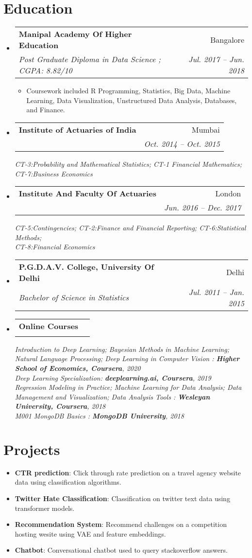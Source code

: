 \documentclass[letterpaper,11pt]{article}
\makeatletter
\newcommand{\resumeItem}[2]{
  \item\small{
    \textbf{#1}{: #2 \vspace{-2pt}}
  }
}
\newcommand{\textItem}[1]{
  \item\small{
    {#1 \vspace{-2pt}}
  }
}
\newcommand{\resumeSubheading}[4]{
  \vspace{-1pt}\item
    \begin{tabular*}{0.97\textwidth}[t]{l@{\extracolsep{\fill}}r}
      \textbf{#1} & #2 \\
      \textit{\small#3} & \textit{\small #4} \\
    \end{tabular*}\vspace{-5pt}
}
\newcommand{\resumeSubItem}[2]{\resumeItem{#1}{#2}\vspace{-4pt}}
\newcommand{\resumeSubHeadingListStart}{\begin{itemize}[leftmargin=*]}
\newcommand{\resumeSubHeadingListEnd}{\end{itemize}}
\newcommand{\resumeItemListStart}{\begin{itemize}}
\newcommand{\resumeItemListEnd}{\end{itemize}\vspace{-5pt}}
\makeatother
\begin{document}
\section{Education}
  \resumeSubHeadingListStart
    \resumeSubheading
      {Manipal Academy Of Higher Education}{Bangalore}
      {Post Graduate Diploma in Data Science ;  CGPA: 8.82/10}{Jul. 2017 -- Jun. 2018}
      \resumeItemListStart
      	\textItem{Coursework included R Programming, Statistics, Big Data, Machine Learning, Data Visualization, Unstructured Data Analysis, Databases, and Finance.}
      \resumeItemListEnd	
    \resumeSubheading
      {Institute of Actuaries of India}{Mumbai}{}{Oct. 2014 -- Oct. 2015\vspace{-7pt}}
      \textit{\small CT-3:Probability and Mathematical Statistics; CT-1 Financial Mathematics;}\\
      \textit{\small CT-7:Business Economics}
    \resumeSubheading
      {Institute And Faculty Of Actuaries}{London}{}{Jun. 2016 -- Dec. 2017\vspace{-7pt}}
      \textit{\small CT-5:Contingencies; CT-2:Finance and Financial Reporting; CT-6:Statistical Methods;}\\
      \textit{\small CT-8:Financial Economics} 
	\resumeSubheading
	  {P.G.D.A.V. College, University Of Delhi}{Delhi}
	  {Bachelor of Science in Statistics}{Jul. 2011 -- Jan. 2015}
	\resumeSubheading
	  {Online Courses}{}{}{}
	  \textit{\small Introduction to Deep Learning; Bayesian Methods in Machine Learning; Natural Language Processing; Deep Learning in Computer Vision : \textbf{Higher School of Economics, Coursera}, 2020}\\
	  \textit{\small Deep Learning Specialization: \textbf{deeplearning.ai, Coursera}, 2019}\\
	  \textit{\small Regression Modeling in Practice; Machine Learning for Data Analysis; Data Management and Visualization; Data Analysis Tools : \textbf{Wesleyan University, Coursera}, 2018}\\
	  \textit{\small M001 MongoDB Basics : \textbf{MongoDB University}, 2018}	      
  \resumeSubHeadingListEnd
  

\section{Projects}
  \resumeSubHeadingListStart
    \resumeSubItem{CTR prediction}
      {Click through rate prediction on a travel agency website data using classification algorithms.}
    \resumeSubItem{Twitter Hate Classification}
      {Classification on twitter text data using transformer models.}
    \resumeSubItem{Recommendation System}
      {Recommend challenges on a competition hosting wesite using VAE and feature embeddings.}
    \resumeSubItem{Chatbot}
      {Conversational chatbot used to query stackoverflow answers.}
  \resumeSubHeadingListEnd
\end{document}
